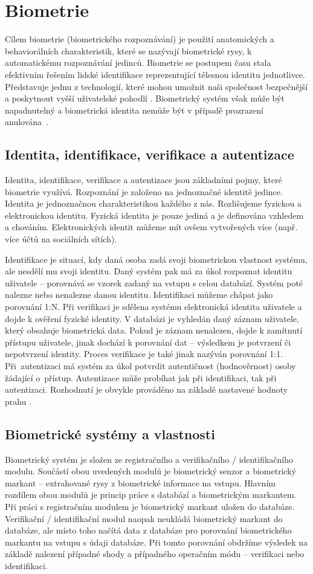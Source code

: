 \section{Biometrie}
Cílem biometrie (biometrického rozpoznávání) je použití anatomických a behaviorálních charakteristik, které se nazývají biometrické rysy, k automatickému rozpoznávání jedinců. Biometrie se postupem času stala efektivním řešením lidské identifikace reprezentující tělesnou identitu jednotlivce. Představuje jednu z technologií, které mohou umožnit naši společnost bezpečnější a poskytnout vyšší uživatelské pohodlí \cite{Maltoni2009}. Biometrický systém však může být napadnutelný a biometrická identita nemůže být v případě prozrazení anulována~\cite{BIOopora}.
\subsection*{Identita, identifikace, verifikace a autentizace}
Identita, identifikace, verifikace a autentizace jsou základními pojmy, které biometrie využívá. Rozpoznání je založeno na jednoznačné identitě jedince. Identita je jednoznačnou charakteristikou každého z nás. Rozlišujeme fyzickou a elektronickou identitu. Fyzická identita je pouze jediná a je definována vzhledem a chováním. Elektronických identit můžeme mít ovšem vytvořených více (např. více účtů na sociálních sítích).

Identifikace je situací, kdy daná osoba zadá svoji biometrickou vlastnost systému, ale nesdělí mu svoji identitu. Daný systém pak má za úkol rozpoznat identitu uživatele -- porovnává se vzorek zadaný na vstupu s celou databází. Systém poté nalezne nebo nenalezne danou identitu. Identifikaci můžeme chápat jako porovnání 1:N. Při verifikaci je sdělena systému elektronická identita uživatele a dojde k ověření fyzické identity. V databázi je vyhledán daný záznam uživatele, který obsahuje biometrická data. Pokud je záznam nenalezen, dojde k zamítnutí přístupu uživatele, jinak dochází k porovnání dat -- výsledkem je potvrzení či nepotvrzení identity. Proces verifikace je také jinak nazýván porovnání 1:1. Při~autentizaci má systém za úkol potvrdit autentičnost (hodnověrnost) osoby žádající o~přístup. Autentizace může probíhat jak při identifikaci, tak při autentizaci. Rozhodnutí je obvykle prováděno na základě nastavené hodnoty prahu \cite{BIOopora}.
\subsection*{Biometrické systémy a vlastnosti}
Biometrický systém je složen ze registračního a verifikačního / identifikačního modulu. Součástí obou uvedených modulů je biometrický senzor a biometrický markant -- extrahované rysy z biometrické informace na vstupu. Hlavním rozdílem obou modulů je princip práce s databází a biometrickým markantem.  Při práci s registračním modulem je biometrický markant uložen do databáze. Verifikační / identifikační modul naopak neukládá biometrický markant do databáze, ale místo toho načítá data z databáze pro porovnání biometrického markantu na vstupu s údaji databáze. Při tomto porovnání obdržíme výsledek na základě nalezení případné shody a případného operačním módu -- verifikaci nebo identifikaci.

